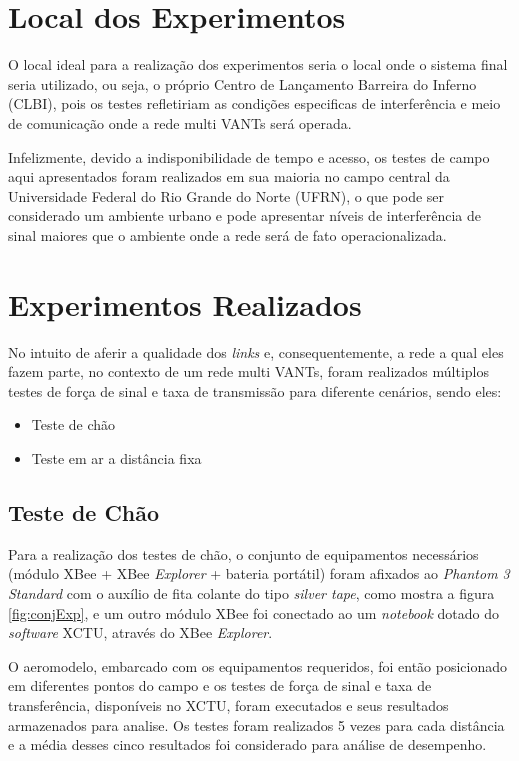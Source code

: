 \section{Local dos Experimentos}

O local ideal para a realização dos experimentos seria o local onde o sistema final seria utilizado, ou seja, o próprio Centro de Lançamento Barreira do Inferno (CLBI), pois os testes refletiriam as condições especificas de interferência e meio de comunicação onde a rede multi VANTs será operada.

Infelizmente, devido a indisponibilidade de tempo e acesso, os testes de campo aqui apresentados foram realizados em sua maioria no campo central da Universidade Federal do Rio Grande do Norte (UFRN), o que pode ser considerado um ambiente urbano e pode apresentar níveis de interferência de sinal maiores que o ambiente onde a rede será de fato operacionalizada. 

\section{Experimentos Realizados}

No intuito de aferir a qualidade dos \emph{links} e, consequentemente, a rede a qual eles fazem parte, no contexto de um rede multi VANTs, foram realizados múltiplos testes de força de sinal e taxa de transmissão para diferente cenários, sendo eles:

\begin{itemize}
\item Teste de chão
\item Teste em ar a distância fixa
\end{itemize} 

\subsection{Teste de Chão}

Para a realização dos testes de chão, o conjunto de equipamentos necessários (módulo XBee + XBee \emph{Explorer} + bateria portátil) foram afixados ao \emph{Phantom 3 Standard} com o auxílio de fita colante do tipo \emph{silver tape}, como mostra a figura \ref{fig:conjExp}, e um outro módulo XBee foi conectado ao um \emph{notebook} dotado do \emph{software} XCTU, através do XBee \emph{Explorer}.

O aeromodelo, embarcado com os equipamentos requeridos, foi então posicionado em diferentes pontos do campo e os testes de força de sinal e taxa de transferência, disponíveis no XCTU, foram executados e seus resultados armazenados para analise. Os testes foram realizados 5 vezes para cada distância e a média desses cinco resultados foi considerado para análise de desempenho. 
 
